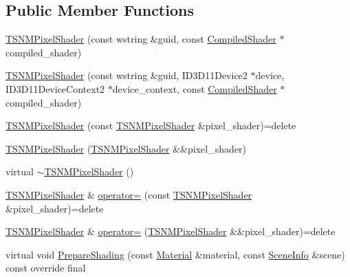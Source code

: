 \subsection*{Public Member Functions}
\begin{DoxyCompactItemize}
\item 
\hyperlink{classmage_1_1_t_s_n_m_pixel_shader_a50c306fae3715ba9b15078b662e2b6d0}{T\+S\+N\+M\+Pixel\+Shader} (const wstring \&guid, const \hyperlink{structmage_1_1_compiled_shader}{Compiled\+Shader} $\ast$compiled\+\_\+shader)
\item 
\hyperlink{classmage_1_1_t_s_n_m_pixel_shader_a4df24026a240aa53aea7bcaddc0f3b77}{T\+S\+N\+M\+Pixel\+Shader} (const wstring \&guid, I\+D3\+D11\+Device2 $\ast$device, I\+D3\+D11\+Device\+Context2 $\ast$device\+\_\+context, const \hyperlink{structmage_1_1_compiled_shader}{Compiled\+Shader} $\ast$compiled\+\_\+shader)
\item 
\hyperlink{classmage_1_1_t_s_n_m_pixel_shader_af01a39116e8759ecd28aaba009c8b8ad}{T\+S\+N\+M\+Pixel\+Shader} (const \hyperlink{classmage_1_1_t_s_n_m_pixel_shader}{T\+S\+N\+M\+Pixel\+Shader} \&pixel\+\_\+shader)=delete
\item 
\hyperlink{classmage_1_1_t_s_n_m_pixel_shader_a4889850bd4ff6c3a3d22c9637752ce37}{T\+S\+N\+M\+Pixel\+Shader} (\hyperlink{classmage_1_1_t_s_n_m_pixel_shader}{T\+S\+N\+M\+Pixel\+Shader} \&\&pixel\+\_\+shader)
\item 
virtual \hyperlink{classmage_1_1_t_s_n_m_pixel_shader_ae7c20ffb872faffb28714b39916e4250}{$\sim$\+T\+S\+N\+M\+Pixel\+Shader} ()
\item 
\hyperlink{classmage_1_1_t_s_n_m_pixel_shader}{T\+S\+N\+M\+Pixel\+Shader} \& \hyperlink{classmage_1_1_t_s_n_m_pixel_shader_a8c9bc92d544b088e9530f8f47df2b4a6}{operator=} (const \hyperlink{classmage_1_1_t_s_n_m_pixel_shader}{T\+S\+N\+M\+Pixel\+Shader} \&pixel\+\_\+shader)=delete
\item 
\hyperlink{classmage_1_1_t_s_n_m_pixel_shader}{T\+S\+N\+M\+Pixel\+Shader} \& \hyperlink{classmage_1_1_t_s_n_m_pixel_shader_a0d714c73017f9bb9b273b2d2a276ab5f}{operator=} (\hyperlink{classmage_1_1_t_s_n_m_pixel_shader}{T\+S\+N\+M\+Pixel\+Shader} \&\&pixel\+\_\+shader)=delete
\item 
virtual void \hyperlink{classmage_1_1_t_s_n_m_pixel_shader_a9b9f44b0cf757061e1c29388c9b20c38}{Prepare\+Shading} (const \hyperlink{structmage_1_1_material}{Material} \&material, const \hyperlink{structmage_1_1_scene_info}{Scene\+Info} \&scene) const override final
\end{DoxyCompactItemize}
